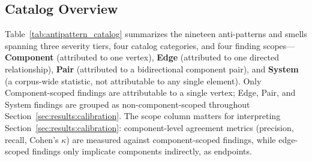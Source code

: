 \subsection{Catalog Overview}
\label{sec:catalog:overview}

Table~\ref{tab:antipattern_catalog} summarizes the nineteen anti-patterns and smells spanning three severity tiers, four catalog categories, and four finding scopes---\textbf{Component} (attributed to one vertex), \textbf{Edge} (attributed to one directed relationship), \textbf{Pair} (attributed to a bidirectional component pair), and \textbf{System} (a corpus-wide statistic, not attributable to any single element). Only Component-scoped findings are attributable to a single vertex; Edge, Pair, and System findings are grouped as non-component-scoped throughout Section~\ref{sec:results:calibration}. The scope column matters for interpreting Section~\ref{sec:results:calibration}: component-level agreement metrics (precision, recall, Cohen's $\kappa$) are measured against component-scoped findings, while edge-scoped findings only implicate components indirectly, as endpoints.

